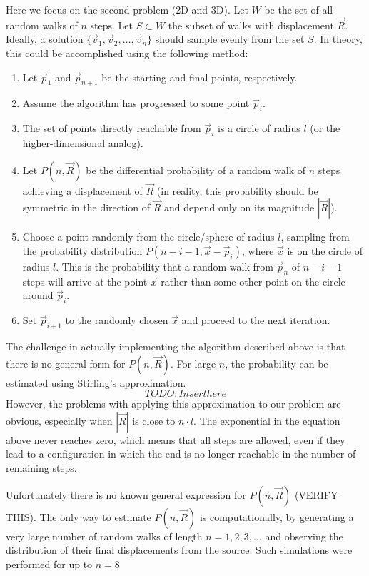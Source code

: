 \documentclass[12pt]{article}
\begin{document}
Here we focus on the second problem (2D and 3D). Let $W$ be the set of all random walks of $n$ steps. Let $S \subset W$ the subset of walks with displacement $\vec{R}$. Ideally, a solution $\{\vec{v}_1, \vec{v}_2, \ldots, \vec{v}_n\}$ should sample evenly from the set $S$. In theory, this could be accomplished using the following method:
\begin{enumerate}
    \item Let $\vec{p}_1$ and $\vec{p}_{n + 1}$ be the starting and final points, respectively.
    \item Assume the algorithm has progressed to some point $\vec{p}_i$.
    \item The set of points directly reachable from $\vec{p}_i$ is a circle of radius $l$ (or the higher-dimensional analog).
    \item Let $P(n, \vec{R})$ be the differential probability of a random walk of $n$ steps achieving a displacement of $\vec{R}$ (in reality, this probability should be symmetric in the direction of $\vec{R}$ and depend only on its magnitude $|\vec{R}|$).
    \item Choose a point randomly from the circle/sphere of radius $l$, sampling from the probability distribution $P(n - i - 1, \vec{x} - \vec{p}_i)$, where $\vec{x}$ is on the circle of radius $l$. This is the probability that a random walk from $\vec{p}_n$ of $n - i - 1$ steps will arrive at the point $\vec{x}$ rather than some other point on the circle around $\vec{p}_i$.
    \item Set $\vec{p}_{i + 1}$ to the randomly chosen $\vec{x}$ and proceed to the next iteration.
\end{enumerate}

The challenge in actually implementing the algorithm described above is that there is no general form for $P(n, \vec{R})$. For large $n$, the probability can be estimated using Stirling's approximation.
\begin{equation*}
    TODO: Insert here
\end{equation*}
However, the problems with applying this approximation to our problem are obvious, especially when $|\vec{R}|$ is close to $n \cdot l$. The exponential in the equation above never reaches zero, which means that all steps are allowed, even if they lead to a configuration in which the end is no longer reachable in the number of remaining steps.

Unfortunately there is no known general expression for $P(n, \vec{R})$ (VERIFY THIS). The only way to estimate $P(n, \vec{R})$ is computationally, by generating a very large number of random walks of length $n = 1, 2, 3, \ldots$ and observing the distribution of their final displacements from the source. Such simulations were performed for up to $n = 8$ 
\end{document}
